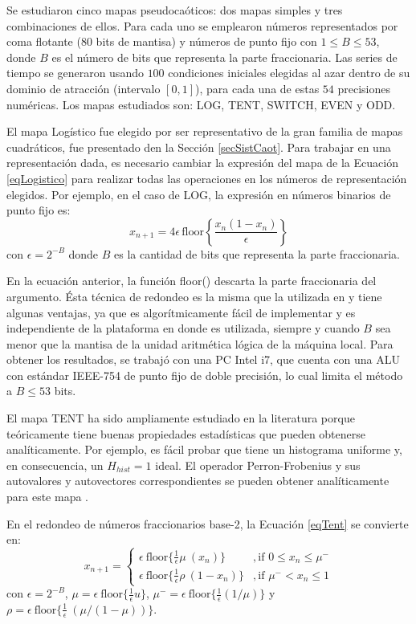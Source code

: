 Se estudiaron cinco mapas pseudocaóticos: dos mapas simples y tres combinaciones de ellos.
Para cada uno se emplearon números representados por coma flotante (80 bits de mantisa) y números de punto fijo con $1\leq B \leq 53$, donde $B$ es el número de bits que representa la parte fraccionaria.
Las series de tiempo se generaron usando $100$ condiciones iniciales elegidas al azar dentro de su dominio de atracción (intervalo $[0,1]$), para cada una de estas $54$ precisiones numéricas.
Los mapas estudiados son: LOG, TENT, SWITCH, EVEN y ODD.

El mapa Logístico fue elegido por ser representativo de la gran familia de mapas cuadráticos, fue presentado den la Sección \ref{secSistCaot}.
Para trabajar en una representación dada, es necesario cambiar la expresión del mapa de la Ecuación \ref{eqLogistico} para realizar todas las operaciones en los números de representación elegidos.
Por ejemplo, en el caso de LOG, la expresión en números binarios de punto fijo es:
%
\begin{equation}\label{eq:logimapB2}
x_{n+1}=4 \epsilon \,\text{floor}\left\{\frac{x_n(1-x_n)}{\epsilon}\right\}
\end{equation}
%
con $\epsilon = 2^{-B}$ donde $B$ es la cantidad de bits que representa la parte fraccionaria.

En la ecuación anterior, la función floor() descarta la parte fraccionaria del argumento. Ésta técnica de redondeo es la misma que la utilizada en \cite{Antonelli2012, Grebogi1988, Nagaraj2008} y tiene algunas ventajas, ya que es algorítmicamente fácil de implementar y es independiente de la plataforma en donde es utilizada, siempre y cuando $B$ sea menor que la mantisa de la unidad aritmética lógica de la máquina local.
Para obtener los resultados, se trabajó con una PC Intel i7, que cuenta con una ALU con estándar IEEE-754 de punto fijo de doble precisión, lo cual limita el método a $B \leq 53$ bits.

El mapa TENT ha sido ampliamente estudiado en la literatura porque teóricamente tiene buenas propiedades estadísticas que pueden obtenerse analíticamente.
Por ejemplo, es fácil probar que tiene un histograma uniforme y, en consecuencia, un $H_{hist} = 1$ ideal.
El operador Perron-Frobenius y sus autovalores y autovectores correspondientes se pueden obtener analíticamente para este mapa \cite{Lasota1994}.

En el redondeo de números fraccionarios base-2, la Ecuación \ref{eqTent} se convierte en:
%
\begin{equation}\label{eq:TENTB2}
x_{n+1} = 
\begin{cases}
\epsilon ~\text{floor} \{\frac{1}{\epsilon} \mu~(x_n)\} &, \textrm{if } 0\leq x_n\leq \mu^-\\
\epsilon ~\text{floor} \{\frac{1}{\epsilon} \rho~(1-x_n)\} &, \textrm{if } \mu^-<x_n\leq 1 
\end{cases}	
\end{equation}
con $\epsilon=2^{-B}$, $\mu = \epsilon ~\text{floor}\{\frac{1}{\epsilon} u\}$, $\mu^- = \epsilon ~\text{floor}\{\frac{1}{\epsilon} (1/\mu)\}$ y $\rho = \epsilon ~\text{floor}\{\frac{1}{\epsilon} ~(\mu/(1-\mu)) \}$.


